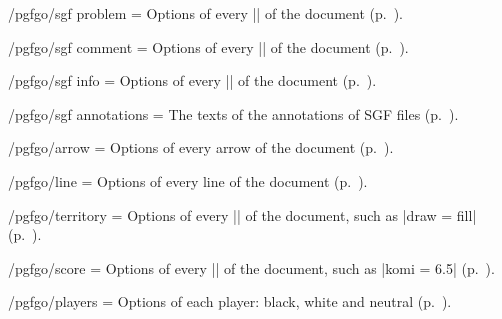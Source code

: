 \begin{key}{/pgfgo/sgf problem = }
	Options of every |\sgfproblem| of the document (p.~\pageref{subsec:sgfproblemas}).
\end{key}

\begin{key}{/pgfgo/sgf comment = }
	Options of every |\sgfcomment| of the document (p.~\pageref{subsec:sgfdatos}).
\end{key}

\begin{key}{/pgfgo/sgf info = }
	Options of every |\sgfinfo| of the document (p.~\pageref{subsec:sgfdatos}).
\end{key}

\begin{key}{/pgfgo/sgf annotations = }
	The texts of the annotations of SGF files (p.~\pageref{subsec:sgfdatos}).
\end{key}

\begin{key}{/pgfgo/arrow = }
	Options of every arrow of the document (p.~\pageref{subsec:flechas}).
\end{key}

\begin{key}{/pgfgo/line = }
	Options of every line of the document (p.~\pageref{subsec:flechas}).
\end{key}

\begin{key}{/pgfgo/territory = }
	Options of every |\territory| of the document, such as |draw = fill| (p.~\pageref{subsec:territorio}).
\end{key}

\begin{key}{/pgfgo/score = }
	Options of every |\pgfgoscore| of the document, such as |komi = 6.5| (p.~\pageref{subsec:territorio}).
\end{key}

\begin{key}{/pgfgo/players = }
	Options of each player: black, white and neutral (p.~\pageref{sec:jugadores}).
\end{key}

\begin{codeexample}[]

	\begin{goban}[3]
	\end{goban}

	\begin{goban}[4]
	\end{goban}
\end{codeexample}

